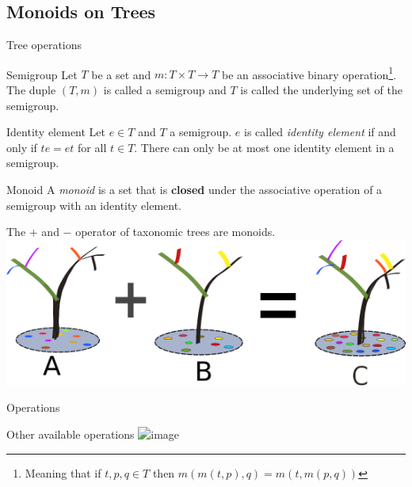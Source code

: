 \documentclass{beamer}
\begin{document}
\subsection{Monoids on Trees}
\begin{frame}{Tree operations}
\begin{block}{Semigroup}
Let $T$ be a set and $m : T \times T \rightarrow T $ be an associative binary operation\footnote{Meaning that if $t,p,q \in T$ then $m(m(t,p),q) = m(t,m(p,q))$ }. 
The duple $(T,m)$ is called a semigroup and $T$ is called the underlying set of the semigroup.
\end{block}

\begin{block}{Identity element}
Let $e \in T$ and $T$ a semigroup. $e$ is called {\em identity element} if and only if $te = et$ for all $t \in T$. There can only be at most one identity element in a semigroup.
\end{block}
\end{frame}

\begin{frame}
\begin{block}{Monoid}
A {\em monoid} is a set that is {\bf closed} under the associative operation of a semigroup with an identity element.
	\end{block}
	The $+$ and $-$ operator of taxonomic trees are monoids.
		\centering
	\includegraphics[scale=1]{sum_monoid.png} 
\end{frame}

\begin{frame}{Operations}
	\begin{block}{Other available operations}
	\centering
	\includegraphics<1>[scale=1.5]{operators.png} 

	\end{block}
\end{frame}
\end{document}
